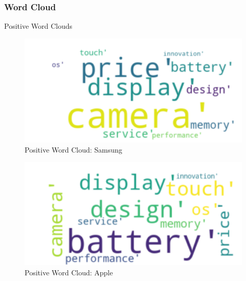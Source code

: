 \documentclass{beamer}
\begin{document}
\begin{frame}
\frametitle{Word Cloud}
{\large Positive Word Clouds}
\begin{figure}
\includegraphics[scale=0.5]{sampos}
\caption{Positive Word Cloud: Samsung}
\end{figure}
\begin{figure}
\includegraphics[scale=0.5]{aplpos}
\caption{Positive Word Cloud: Apple}
\end{figure}
\end{frame}
\end{document}
